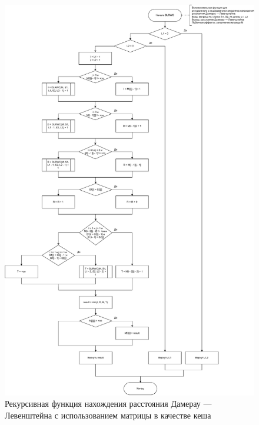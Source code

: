 \begin{figure}[h]
	\centering
	\includegraphics[scale=0.5]{img/dlrwch.pdf}
	\caption{Рекурсивная функция нахождения расстояния Дамерау --- Левенштейна с использованием матрицы в качестве кеша}
	\label{fig:dlrwch}
\end{figure}
